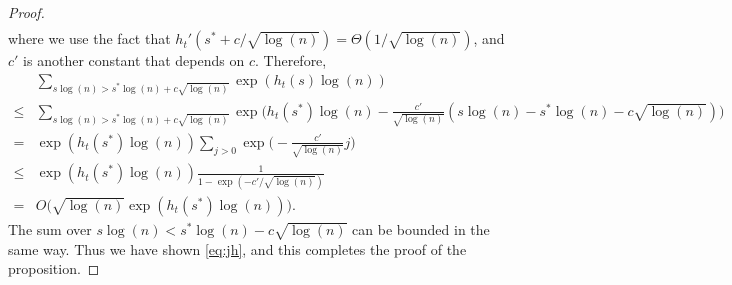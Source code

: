 \documentclass{article}
\begin{document}
\begin{proof}
\begin{align*}
\end{align*}
where we use the fact that $h_t'(s^\ast+c/\sqrt{\log(n)}) = \Theta(1/\sqrt{\log(n)})$, and $c'$ is another constant that depends on $c$.
Therefore,
\begin{align*}
& \sum_{s\log(n) > s^\ast\log(n) + c\sqrt{\log(n)}}
\exp(h_t(s) \log(n))  \\
\le & \sum_{s\log(n) > s^\ast\log(n) + c\sqrt{\log(n)}}
\exp \Big( h_t(s^\ast) \log(n) 
-\frac{c'}{\sqrt{\log(n)}}
(s\log(n)- s^\ast \log(n)- c \sqrt{\log(n)}) \Big)   \\
= & \exp(h_t(s^\ast) \log(n))
\sum_{j>0} \exp \Big( 
-\frac{c'}{\sqrt{\log(n)}} j \Big) \\
\le & \exp(h_t(s^\ast) \log(n))
\frac{1}{1-\exp(-c'/ \sqrt{\log(n)})} \\
= & O\Big(\sqrt{\log(n)} \exp(h_t(s^\ast) \log(n))\Big) .
\end{align*}
The sum over $s\log(n) < s^\ast\log(n) - c\sqrt{\log(n)}$ can be bounded in the same way. Thus we have shown \eqref{eq:jh}, and this completes the proof of the proposition.
\end{proof}




\end{document}
